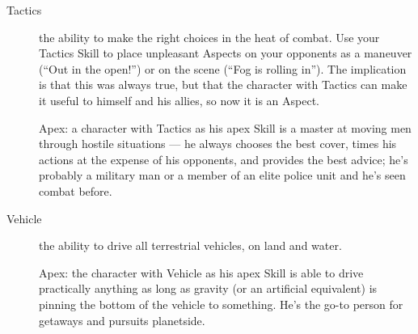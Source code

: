 \begin{description}
\item[Tactics]
the ability to make the right choices in the heat of combat. Use your Tactics Skill to place unpleasant Aspects on your opponents as a maneuver (``Out in the open!'') or on the scene (``Fog is rolling in''). The implication is that this was always true, but that the character with Tactics can make it useful to himself and his allies, so now it is an Aspect.

Apex: a character with Tactics as his apex Skill is a master at moving men through hostile situations --- he always chooses the best cover, times his actions at the expense of his opponents, and provides the best advice; he's probably a military man or a member of an elite police unit and he's seen combat before.

\item[Vehicle]
the ability to drive all terrestrial vehicles, on land and water.

Apex: the character with Vehicle as his apex Skill is able to drive practically anything as long as gravity (or an artificial equivalent) is pinning the bottom of the vehicle to something. He's the go-to person for getaways and pursuits planetside.
\end{description}

